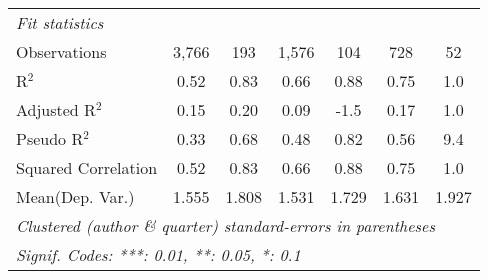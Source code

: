 \begin{tabular}{lcccccc}
   \midrule
   \emph{Fit statistics}\\
   Observations                                               & 3,766        & 193           & 1,576        & 104          & 728     & 52\\  
   R$^2$                                                      & 0.52         & 0.83          & 0.66         & 0.88         & 0.75    & 1.0\\  
   Adjusted R$^2$                                             & 0.15         & 0.20          & 0.09         & -1.5         & 0.17    & 1.0\\  
   Pseudo R$^2$                                               & 0.33         & 0.68          & 0.48         & 0.82         & 0.56    & 9.4\\  
   Squared Correlation                                        & 0.52         & 0.83          & 0.66         & 0.88         & 0.75    & 1.0\\  
Mean(Dep. Var.) & 1.555 & 1.808 & 1.531 & 1.729 & 1.631 & 1.927 \\
   \midrule \midrule
   \multicolumn{7}{l}{\emph{Clustered (author \& quarter) standard-errors in parentheses}}\\
   \multicolumn{7}{l}{\emph{Signif. Codes: ***: 0.01, **: 0.05, *: 0.1}}\\
\end{tabular}
\par\endgroup
